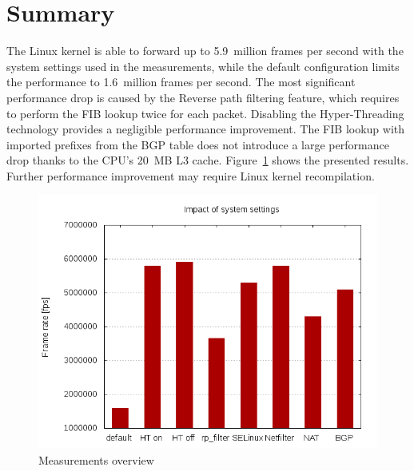 \section{Summary}
The Linux kernel is able to forward up to 5.9~million frames per second
with the system settings used in the measurements,
while the default configuration limits the performance to 1.6~million frames per second.
The most significant performance drop is caused by the Reverse path filtering feature,
which requires to perform the FIB lookup twice for each packet.
Disabling the Hyper-Threading technology provides a negligible performance improvement.
The FIB lookup with imported prefixes from the BGP table does not introduce a large performance drop
thanks to the CPU's 20~MB L3 cache.
Figure~\ref{fig:measurements-overview} shows the presented results.
Further performance improvement may require Linux kernel recompilation.
	\begin{figure}[H]
		\centering
		\includegraphics[width=11.5cm,keepaspectratio]{fig/settings.png}
		\caption{Measurements overview}
		\label{fig:measurements-overview}
	\end{figure}

